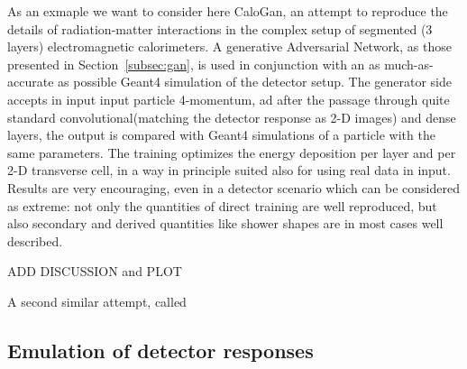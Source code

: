 As an exmaple we want to consider here CaloGan\cite{calogan}, an attempt to reproduce the details of radiation-matter interactions in the complex setup of segmented (3 layers) electromagnetic calorimeters.
A generative Adversarial Network, as those presented in Section~\ref{subsec:gan}, is used in conjunction with an as much-as-accurate as possible Geant4 simulation of the detector setup. The generator side accepts in input input particle 4-momentum, ad after the passage through quite standard convolutional(matching the detector response as 2-D images) and dense layers, the output is compared with Geant4 simulations of a particle with the same parameters.  The training optimizes the energy deposition per layer and per 2-D transverse cell, in a way in principle suited also for using real data in input. Results are very encouraging, even in a detector scenario which can be considered as extreme: not only the quantities of direct training are well reproduced, but also secondary and derived quantities like shower shapes are in most cases well described.

ADD DISCUSSION and PLOT

A second similar attempt, called 



\subsection{Emulation of detector responses}
